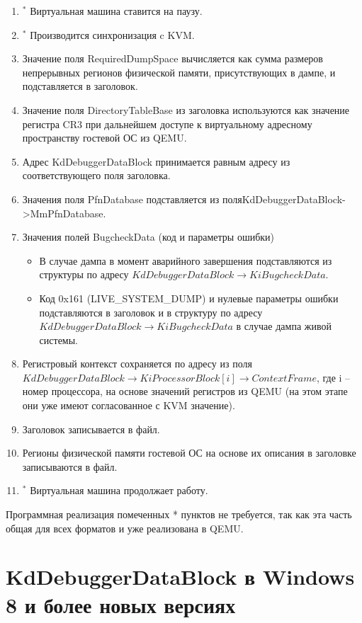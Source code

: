 \documentclass{mipt-thesis-bs}
\begin{document}
\begin{enumerate}
    \item $\!\!\!\!{^*}$ Виртуальная машина ставится на паузу.
    \item $\!\!\!\!{^*}$ Производится синхронизация c KVM.
    \item Значение поля RequiredDumpSpace вычисляется как сумма размеров непрерывных регионов физической памяти, присутствующих в дампе, и подставляется в заголовок.
    \item Значение поля DirectoryTableBase из заголовка используются как значение регистра CR3 при дальнейшем доступе к виртуальному адресному пространству гостевой ОС из QEMU.
    \item Адрес KdDebuggerDataBlock принимается равным адресу из соответствующего поля заголовка.
    \item Значения поля PfnDatabase подставляется из поля\newline KdDebuggerDataBlock->MmPfnDatabase.
    \item Значения полей BugcheckData (код и параметры ошибки)
    \begin{itemize}
        \item В случае дампа в момент аварийного завершения подставляются из структуры по адресу $KdDebuggerDataBlock \! \rightarrow \! KiBugcheckData$.
        \item Код 0x161 (LIVE{\_}SYSTEM{\_DUMP}) и нулевые параметры ошибки подставляются в заголовок и в структуру по адресу $KdDebuggerDataBlock \! \rightarrow \! KiBugcheckData$ в случае дампа живой системы.
    \end{itemize}
    \item Регистровый контекст сохраняется по адресу из поля $KdDebuggerDataBlock \! \rightarrow \! KiProcessorBlock[i] \! \rightarrow \! ContextFrame$, где i -- номер процессора, на основе значений регистров из QEMU (на этом этапе они уже имеют согласованное с KVM значение).
    \item Заголовок записывается в файл.
    \item Регионы физической памяти гостевой ОС на основе их описания в заголовке записываются в файл.
    \item $\!\!\!\!{^*}$ Виртуальная машина продолжает работу.
\end{enumerate}

Программная реализация помеченных {*} пунктов не требуется, так как эта часть общая для всех форматов и уже реализована в QEMU.

\section*{KdDebuggerDataBlock в Windows 8 и более новых версиях}
\end{document}
